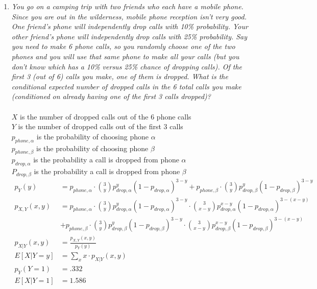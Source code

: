 \documentclass{article} %
\begin{document}
\begin{enumerate}
\begin{enumerate}
	\end{enumerate}
	
	\item \textit{You go on a camping trip with two friends who each have a mobile phone. Since you are out in the wilderness, mobile phone reception isn't very good. One friend's phone will independently drop calls with 10\% probability. Your other friend's phone will independently drop calls with 25\% probability. Say you need to make 6 phone calls, so you randomly choose one of the two phones and you will use that same phone to make all your calls (but you don't know which has a 10\% versus 25\% chance of dropping calls). Of the first 3 (out of 6) calls you make, one of them is dropped. What is the conditional expected number of dropped calls in the 6 total calls you make (conditioned on already having one of the first 3 calls dropped)?}\\
	\\
	$X$ is the number of dropped calls out of the 6 phone calls\\
	$Y$ is the number of dropped calls out of the first 3 calls\\
	$p_{phone,\alpha}$ is the probability of choosing phone $\alpha$\\
	$p_{phone,\beta}$ is the probability of choosing phone $\beta$\\
	$p_{drop,\alpha}$ is the probability a call is dropped from phone $\alpha$\\
	$P_{drop,\beta}$ is the probability a call is dropped from phone $\beta$
	\begin{align*}
	p_Y(y) &= p_{phone,\alpha} \cdot \binom{3}{y} p_{drop,\alpha}^y (1 - p_{drop,\alpha})^{3 - y} + p_{phone,\beta} \cdot \binom{3}{y} p_{drop,\beta}^y (1 - p_{drop,\beta})^{3 - y}\\
	p_{X,Y}(x, y) &= p_{phone,\alpha} \cdot \binom{3}{y} p_{drop,\alpha}^y (1 - p_{drop,\alpha})^{3 - y} \cdot \binom{3}{x - y} p_{drop,\alpha}^{x-y} (1 - p_{drop,\alpha})^{3-(x-y)}\\
	&+ p_{phone,\beta} \cdot \binom{3}{y} p_{drop,\beta}^y (1 - p_{drop,\beta})^{3 - y} \cdot \binom{3}{x - y} p_{drop,\beta}^{x-y} (1 - p_{drop,\beta})^{3-(x-y)}\\
	p_{X|Y}(x, y) &= \frac{p_{X,Y}(x, y)}{p_Y(y)}\\
	E[X | Y = y] &= \sum_{x} x \cdot p_{X|Y}(x, y)\\
	p_Y(Y = 1) &= .332\\
	E[X | Y = 1] &= 1.586
	\end{align*}
	

\end{enumerate}
\end{document}
